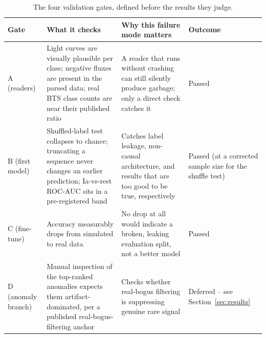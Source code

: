 \begin{table}[htb]
\centering
\caption{The four validation gates, defined before the results they judge.}
\label{tab:gates}
\small
\begin{tabular}{L{1.5cm}L{4.6cm}L{4.6cm}L{3.6cm}}
\toprule
Gate & What it checks & Why this failure mode matters & Outcome \\
\midrule
A (readers) & Light curves are visually plausible per class; negative
  fluxes are present in the parsed data; real BTS class counts are near
  their published ratio & A reader that runs without crashing can still
  silently produce garbage; only a direct check catches it & Passed \\
B (first model) & Shuffled-label test collapses to chance; truncating a
  sequence never changes an earlier prediction; Ia-vs-rest ROC-AUC sits in
  a pre-registered band & Catches label leakage, non-causal architecture,
  and results that are too good to be true, respectively & Passed (at a
  corrected sample size for the shuffle test) \\
C (fine-tune) & Accuracy measurably drops from simulated to real data & No
  drop at all would indicate a broken, leaking evaluation split, not a
  better model & Passed \\
D (anomaly branch) & Manual inspection of the top-ranked anomalies expects
  them artifact-dominated, per a published real-bogus-filtering anchor &
  Checks whether real-bogus filtering is suppressing genuine rare signal &
  Deferred -- see Section~\ref{sec:results} \\
\bottomrule
\end{tabular}
\end{table}

